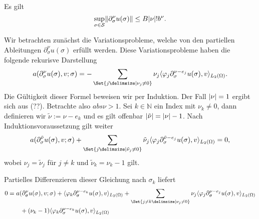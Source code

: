 \begin{Satz}
\label{satz:cha3:part_ableitung_schranke}
    Es gilt
    \begin{equation}
        \sup_{\sigma \in \mathcal S} \lVert\partial^{\nu}_{\sigma} u(\sigma)\rVert \leq B \lvert\nu\rvert! b^{\nu}.
    \end{equation}

    \begin{Beweis}
        Wir betrachten zunächst die Variationsprobleme, welche von den partiellen Ableitungen $\partial^{\nu}_{\sigma} u(\sigma)$ erfüllt werden.
        Diese Variationsprobleme haben die folgende rekurisve Darstellung
        \begin{equation}
            a(\partial^{\nu}_{\sigma} u(\sigma), v; \sigma)
            = - \sum_{\Set{j \given \nu_{j} \neq 0}} \nu_{j} \skp{\varphi_{j} \partial^{\nu - e_{j}}_{\sigma} u(\sigma)}{v}{L_{2}(\Omega)}.
        \end{equation}
        Die Gültigkeit dieser Formel beweisen wir per Induktion.
        Der Fall $\lvert\nu\rvert = 1$ ergibt sich aus (??).
        Betrachte also $abs{\nu} > 1$.
        Sei $k \in \mathbb{N}$ ein Index mit $\nu_{k} \neq 0$, dann definieren wir $\tilde{\nu} := \nu - e_{k}$ und es gilt offenbar $\lvert\tilde{\nu}\rvert = \lvert\nu\rvert - 1$.
        Nach Induktionsvoraussetzung gilt weiter
        \begin{equation}
            a(\partial^{\tilde{\nu}}_{\sigma} u(\sigma), v; \sigma) + \sum_{\Set{j \given \tilde{\nu}_{j} \neq 0}} \tilde{\nu}_{j} \skp{\varphi_{j} \partial^{\tilde{\nu} - e_{j}}_{\sigma} u(\sigma)}{v}{L_{2}(\Omega)} = 0,
        \end{equation}
        wobei $\nu_{j} = \tilde{\nu}_{j}$ für $j \neq k$ und $\tilde{\nu}_{k} = \nu_{k} - 1$ gilt.

        Partielles Differenzieren dieser Gleichung nach $\sigma_{k}$ liefert
        \begin{align}
            0 &=
                a(\partial^{\nu}_{\sigma} u(\sigma), v; \sigma)
                + \skp{\varphi_{k} \partial^{\nu - e_{k}}_{\sigma} u(\sigma)}{v}{L_{2}(\Omega)}
                + \sum_{\Set{j \neq k \given \nu_{j} \neq 0}} \nu_{j} \skp{\varphi_{j} \partial^{\nu - e_{j}}_{\sigma} u(\sigma)}{v}{L_{2}(\Omega)}
            \\&\qquad     + (\nu_{k} - 1) \skp{\varphi_{k} \partial^{\nu - e_{k}}_{\sigma} u(\sigma) }{v}{L_{2}(\Omega)}
        \end{align}


\end{Beweis}
\end{Satz}
